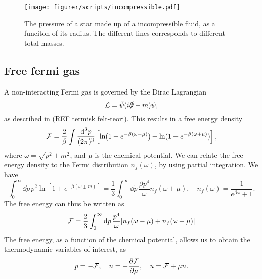 \begin{figure}
    \centering
    \texttt{[image: figurer/scripts/incompressible.pdf]}
    \caption{The pressure of a star made up of a incompressible fluid, as a funciton of its radius. The different lines corresponds to different total masses.}
    \label{fig: pressure incompressible fluid}
\end{figure}



\subsection*{Free fermi gas}

A non-interacting Fermi gas is governed by the Dirac Lagrangian
%
\begin{equation}
    \mathcal{L} = \bar \psi (i \slashed \partial - m) \psi,
\end{equation}
%
as described in (REF termisk felt-teori).
This results in a free energy density
%
\begin{equation}
    \mathcal{F} = \frac{2}{\beta}\int \frac{\text{d}^3 p}{(2 \pi)^3} \left[
        \ln(1 + e^{-\beta(\omega - \mu)})
        + 
        \ln(1 + e^{-\beta(\omega + \mu)})
    \right],
\end{equation}
%
where $\omega = \sqrt{p^2 + m^2}$, and $\mu$ is the chemical potential.
We can relate the free energy density to the Fermi distribution $n_f(\omega)$, by using partial integration.
We have
%
\begin{equation*}
    \int_0^\infty \dd p \, p^2 \ln\left[1 + e^{-\beta(\omega \pm m)}\right]
    = 
    \frac{1}{3} \int_0^\infty \dd p \, \frac{ \beta p^4}{\omega}n_f(\omega \pm \mu),
    \quad
    n_f(\omega) = \frac{1}{e^{\beta \omega} + 1}.
\end{equation*}
%
The free energy can thus be written as 
%
\begin{equation}
    \label{free energy integrated by parts}
    \mathcal{F} = \frac{2}{3} \int_0^\infty \text{d} p \, \frac{p^4}{\omega} [n_f(\omega - \mu) + n_f(\omega + \mu)]
\end{equation}
%
The free energy, as a function of the chemical potential, allows us to obtain the thermodynamic variables of interest, as
%
\begin{equation}
    p = - \Eff, \quad n = - \diffp{\Eff}{\mu}, \quad u = \Eff + \mu n.
\end{equation}
